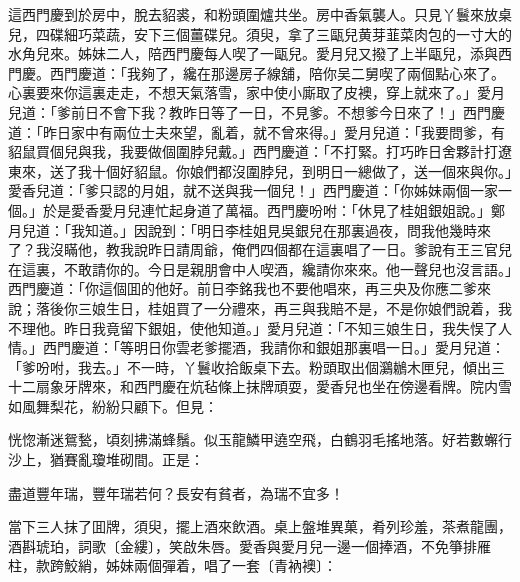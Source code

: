 這西門慶到於房中，脫去貂裘，和粉頭圍爐共坐。房中香氣襲人。只見丫鬟來放桌兒，四碟細巧菜蔬，安下三個薑碟兒。須臾，拿了三甌兒黄芽韮菜肉包的一寸大的水角兒來。姊妹二人，陪西門慶每人喫了一甌兒。愛月兒又撥了上半甌兒，添與西門慶。西門慶道：「我夠了，纔在那邊房子線舖，陪你吴二舅喫了兩個點心來了。心裏要來你這裏走走，不想天氣落雪，家中使小廝取了皮襖，穿上就來了。」愛月兒道：「爹前日不會下我？教昨日等了一日，不見爹。不想爹今日來了！」西門慶道：「昨日家中有兩位士夫來望，亂着，就不曾來得。」愛月兒道：「我要問爹，有貂鼠買個兒與我，我要做個圍脖兒戴。」西門慶道：「不打緊。打巧昨日舍夥計打遼東來，送了我十個好貂鼠。你娘們都沒圍脖兒，到明日一總做了，送一個來與你。」愛香兒道：「爹只認的月姐，就不送與我一個兒！」西門慶道：「你姊妹兩個一家一個。」於是愛香愛月兒連忙起身道了萬福。西門慶吩咐：「休見了桂姐銀姐說。」鄭月兒道：「我知道。」因說到：「明日李桂姐見吳銀兒在那裏過夜，問我他幾時來了？我沒瞞他，教我說昨日請周爺，俺們四個都在這裏唱了一日。爹說有王三官兒在這裏，不敢請你的。今日是親朋會中人喫酒，纔請你來來。他一聲兒也沒言語。」西門慶道：「你這個囬的他好。前日李銘我也不要他唱來，再三央及你應二爹來說；落後你三娘生日，桂姐買了一分禮來，再三與我賠不是，不是你娘們說着，我不理他。昨日我竟留下銀姐，使他知道。」愛月兒道：「不知三娘生日，我失悮了人情。」西門慶道：「等明日你雲老爹擺酒，我請你和銀姐那裏唱一日。」愛月兒道：「爹吩咐，我去。」不一時，丫鬟收拾飯桌下去。粉頭取出個鸂鶒木匣兒，傾出三十二扇象牙牌來，和西門慶在炕毡條上抹牌頑耍，愛香兒也坐在傍邊看牌。院内雪如風舞梨花，紛紛只顧下。但見：

\begin{myquote}
恍惚漸迷鴛甃，頃刻拂滿蜂鬚。似玉龍鱗甲遶空飛，白鶴羽毛搖地落。好若數蠏行沙上，猶賽亂瓊堆砌間。正是：

盡道豐年瑞，豐年瑞若何？長安有貧者，為瑞不宜多！
\end{myquote}

當下三人抹了囬牌，須臾，擺上酒來飲酒。桌上盤堆異菓，肴列珍羞，茶煮龍團，酒斟琥珀，詞歌〔金縷〕，笑啟朱唇。愛香與愛月兒一邊一個捧酒，不免箏排雁柱，款跨鮫綃，姊妹兩個彈着，唱了一套〔青衲襖〕：

